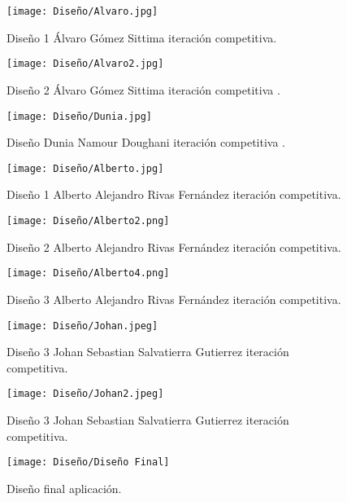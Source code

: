 \begin{figure}[ht!]
    \centering
    \texttt{[image: Diseño/Alvaro.jpg]}
    \caption{Diseño 1 Álvaro Gómez Sittima iteración competitiva.}
    \label{IteracionCompetitiva1}
\end{figure}
\begin{figure}[ht!]
    \centering
    \texttt{[image: Diseño/Alvaro2.jpg]}
    \caption{Diseño 2 Álvaro Gómez Sittima iteración competitiva .}
    \label{IteracionCompetitiva2}
\end{figure}
\begin{figure}[ht!]
    \centering
    \texttt{[image: Diseño/Dunia.jpg]}
    \caption{Diseño Dunia Namour Doughani iteración competitiva .}
    \label{IteracionCompetitiva3}
\end{figure}
\begin{figure}[ht!]
    \centering
    \texttt{[image: Diseño/Alberto.jpg]}
    \caption{Diseño 1 Alberto Alejandro Rivas Fernández iteración competitiva.}
    \label{IteracionCompetitiva4}
\end{figure}
\begin{figure}[ht!]
  \centering
  \texttt{[image: Diseño/Alberto2.png]}
  \caption{Diseño 2 Alberto Alejandro Rivas Fernández iteración competitiva.}
  \label{IteracionCompetitivaA2}
\end{figure}
\begin{figure}[ht!]
  \centering
  \texttt{[image: Diseño/Alberto4.png]}
  \caption{Diseño 3 Alberto Alejandro Rivas Fernández iteración competitiva.}
  \label{IteracionCompetitivaA3}
\end{figure}
\begin{figure}[ht!]
  \centering
  \texttt{[image: Diseño/Johan.jpeg]}
  \caption{Diseño 3 Johan Sebastian Salvatierra Gutierrez iteración competitiva.}
  \label{IteracionCompetitivaJ1}
\end{figure}
\begin{figure}[ht!]
  \centering
  \texttt{[image: Diseño/Johan2.jpeg]}
  \caption{Diseño 3 Johan Sebastian Salvatierra Gutierrez iteración competitiva.}
  \label{IteracionCompetitivaJ2}
\end{figure}
\begin{figure}[ht!]
  \centering
  \texttt{[image: Diseño/Diseño Final]}
  \caption{Diseño final aplicación.}
  \label{diseño_final}
\end{figure}
